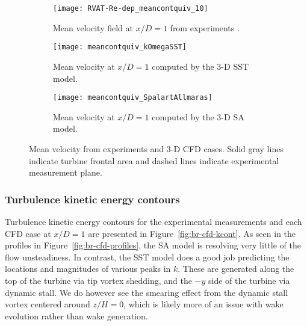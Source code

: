 \begin{figure}
    \centering
    \begin{subfigure}[b]{\textwidth}
       \centering

        \texttt{[image: RVAT-Re-dep\_meancontquiv\_10]}

       \caption{Mean velocity field at $x/D=1$ from experiments
           \cite{Bachant2016-RVAT-Re-dep}.}

       \label{fig:br-cfd-meancontquiv-exp}
   \end{subfigure}

   \begin{subfigure}[b]{\textwidth}
       \centering

        \texttt{[image: meancontquiv\_kOmegaSST]}

       \caption{Mean velocity at $x/D=1$ computed by the 3-D SST model.}

       \label{fig:meancontquiv-SST}
   \end{subfigure}

   \begin{subfigure}[b]{\textwidth}
       \centering

        \texttt{[image: meancontquiv\_SpalartAllmaras]}

       \caption{Mean velocity at $x/D=1$ computed by the 3-D SA model.}

       \label{fig:meancontquiv-SA}
   \end{subfigure}

    \caption{Mean velocity from experiments and 3-D CFD cases. Solid gray lines
        indicate turbine frontal area and dashed lines indicate experimental
        measurement plane.}

    \label{fig:br-cfd-mean-velocity}
\end{figure}


\subsubsection{Turbulence kinetic energy contours}

Turbulence kinetic energy contours for the experimental measurements and each
CFD case at $x/D=1$ are presented in Figure~\ref{fig:br-cfd-kcont}. As seen in
the profiles in Figure~\ref{fig:br-cfd-profiles}, the SA model is resolving very
little of the flow unsteadiness. In contrast, the SST model does a good job
predicting the locations and magnitudes of various peaks in $k$. These are
generated along the top of the turbine via tip vortex shedding, and the $-y$
side of the turbine via dynamic stall. We do however see the smearing effect
from the dynamic stall vortex centered around $z/H=0$, which is likely more of
an issue with wake evolution rather than wake generation.

